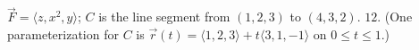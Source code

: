 {$\vec F = \langle z,x^2,y\rangle$; $C$ is the line segment from $(1,2,3)$ to $(4,3,2)$.
}
{$12$. (One parameterization for $C$ is $\vec r(t) = \langle 1,2,3\rangle+t\langle 3,1,-1\rangle$ on $0\leq t\leq 1$.)
}
